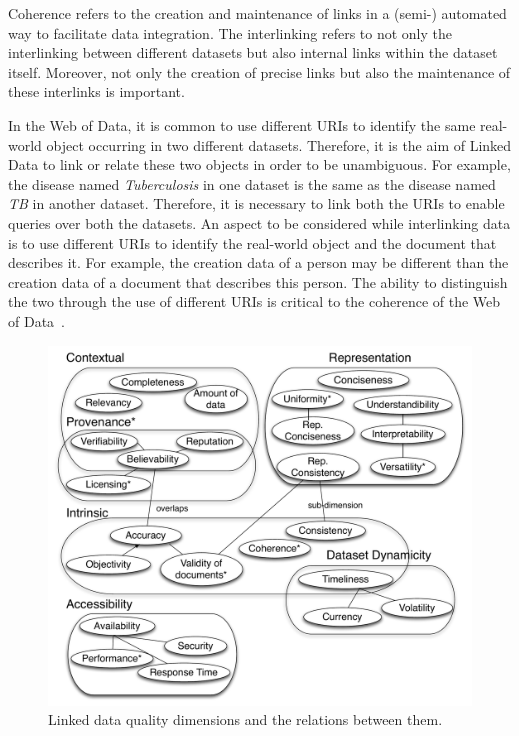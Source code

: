 \begin{definition}[Coherence]
Coherence refers to the creation and maintenance of links in a (semi-) automated way to facilitate data integration.
The interlinking refers to not only the interlinking between different datasets but also internal links within the dataset itself. 
Moreover, not only the creation of precise links but also the maintenance of these interlinks is important. 
\end{definition}

In the Web of Data, it is common to use different URIs to identify the same real-world object occurring in two different datasets. 
Therefore, it is the aim of Linked Data to link or relate these two objects in order to be unambiguous. 
For example, the disease named \emph{Tuberculosis} in one dataset is the same as the disease named \emph{TB} in another dataset. 
Therefore, it is necessary to link both the URIs to enable queries over both the datasets. 
An aspect to be considered while interlinking data is to use different URIs to identify the real-world object and the document that describes it.
For example, the creation data of a person may be different than the creation data of a document that describes this person.
The ability to distinguish the two through the use of different URIs is critical to the coherence of the Web of Data~\cite{Heath}.


\begin{figure}[htb]
\includegraphics[width=5in]{DimensionsRelations.pdf}
\caption{Linked data quality dimensions and the relations between them.}
\label{fig:dimrel}
\end{figure}
